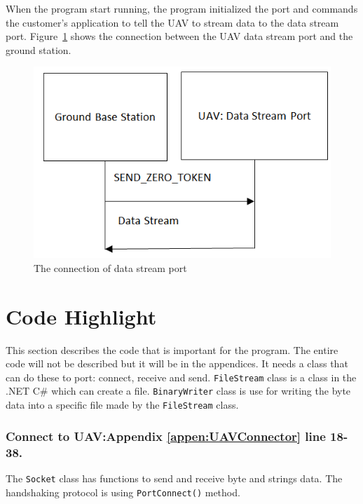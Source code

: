 When the program start running, the program initialized the port and commands the customer’s application to tell the UAV to stream data to the data stream port. Figure~\ref{GCS_connect_command} shows the connection between the UAV data stream port and the ground station.

\begin{figure}[!hbtp]
\begin{center}
\includegraphics[scale=0.5]{figures/connect_command.png} 
\end{center}
\caption{The connection of data stream port\label{GCS_connect_command}}
\end{figure}


 
\section{Code Highlight}

This section describes the code that is important for the program. The entire code will not be described but it will be in the appendices. It needs a class that can do these to port: connect, receive and send. \texttt{FileStream} class is a class in the .NET C\# which can create a file. \texttt{BinaryWriter} class is use for writing the byte data into a specific file made by the \texttt{FileStream} class. 

\subsubsection*{Connect to UAV:Appendix \ref{appen:UAVConnector} line 18-38.}
The \texttt{Socket} class has functions to send and receive byte and strings data. The handshaking protocol is using \texttt{PortConnect()} method.  
        
